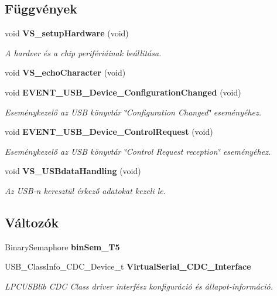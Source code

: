 \subsection*{Függvények}
\begin{DoxyCompactItemize}
\item 
void {\bf V\-S\-\_\-setup\-Hardware} (void)
\begin{DoxyCompactList}\small\item\em A hardver és a chip perifériáinak beállítása. \end{DoxyCompactList}\item 
void {\bf V\-S\-\_\-echo\-Character} (void)
\item 
void {\bf E\-V\-E\-N\-T\-\_\-\-U\-S\-B\-\_\-\-Device\-\_\-\-Configuration\-Changed} (void)
\begin{DoxyCompactList}\small\item\em Eseménykezelő az U\-S\-B könyvtár \char`\"{}\-Configuration Changed\char`\"{} eseményéhez. \end{DoxyCompactList}\item 
void {\bf E\-V\-E\-N\-T\-\_\-\-U\-S\-B\-\_\-\-Device\-\_\-\-Control\-Request} (void)
\begin{DoxyCompactList}\small\item\em Eseménykezelő az U\-S\-B könyvtár \char`\"{}\-Control Request reception\char`\"{} eseményéhez. \end{DoxyCompactList}\item 
void {\bf V\-S\-\_\-\-U\-S\-Bdata\-Handling} (void)
\begin{DoxyCompactList}\small\item\em Az U\-S\-B-\/n keresztül érkező adatokat kezeli le. \end{DoxyCompactList}\end{DoxyCompactItemize}
\subsection*{Változók}
\begin{DoxyCompactItemize}
\item 
Binary\-Semaphore {\bf bin\-Sem\-\_\-\-T5}
\item 
U\-S\-B\-\_\-\-Class\-Info\-\_\-\-C\-D\-C\-\_\-\-Device\-\_\-t {\bf Virtual\-Serial\-\_\-\-C\-D\-C\-\_\-\-Interface}
\begin{DoxyCompactList}\small\item\em L\-P\-C\-U\-S\-Blib C\-D\-C Class driver interfész konfiguráció és állapot-\/információ. \end{DoxyCompactList}\end{DoxyCompactItemize}


